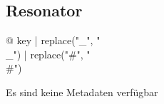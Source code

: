 \begin{multicols}{2}
\subsection{Resonator}

\begin{description}
\item[{@ key | replace("_", "\\_") | replace("#", "\\#") }] %
\end{description}
Es sind keine Metadaten verfügbar

\end{multicols}